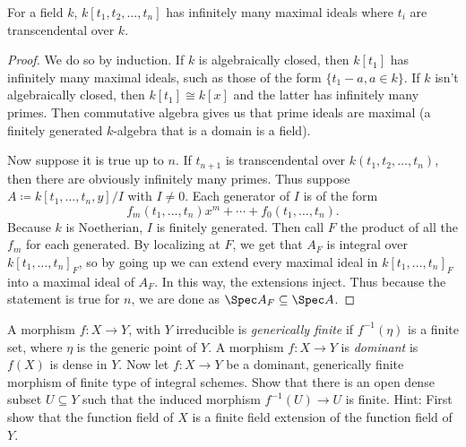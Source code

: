 \begin{lem}\label{lem:infinite_primes}
	For a field $k $, $k[t_{1},t_{2},\ldots,t_n] $ has infinitely many maximal ideals where $t_i $ are transcendental over $k $.
\end{lem}
\begin{proof}
	We do so by induction.
	If $k $ is algebraically closed, then $k[t_{1}] $ has infinitely many maximal ideals, such as those of the form $\{t_{1}-a,a\in k\}  $.
	If $k $ isn't algebraically closed, then $k[t_{1}]\cong k[x] $ and the latter has infinitely many primes.
	Then commutative algebra gives us that prime ideals are maximal (a finitely generated $k $-algebra that is a domain is a field).

	Now suppose it is true up to $n $.
	If $t_{n+1} $ is transcendental over $k(t_{1},t_{2},\ldots,t_n) $, then there are obviously infinitely many primes.
	Thus suppose $A \coloneqq k[t_{1},\ldots,t_{n}, y] / I$ with $I \ne 0 $.
	Each generator of $I $ is of the form
	\[
		f_m(t_{1},\ldots,t_n) x^m + \cdots + f_{0}(t_{1},\ldots,t_n)
	.\]
	Because $k $ is Noetherian, $I $ is finitely generated.
	Then call $F $ the product of all the $f_m $ for each generated.
	By localizing at $F $, we get that $A_{F}$ is integral over $k[t_{1},\ldots,t_n]_F $, so by going up we can extend every maximal ideal in $k[t_{1},\ldots,t_n]_F$ into a maximal ideal of $A_F$.
	In this way, the extensions inject.
	Thus because the statement is true for $n $, we are done as $\Spec A_F \subseteq \Spec A $.
\end{proof}
\begin{exercise}%
	A morphism $f: X\to Y $, with $Y $ irreducible is \textit{generically finite} if $f^{-1}(\eta ) $ is a finite set, where $\eta  $ is the generic point of $Y $. A morphism $f: X\to Y $ is \textit{dominant} is $f(X) $ is dense in $Y $. Now let $f: X\to Y $ be a dominant, generically finite morphism of finite type of integral schemes. Show that there is an open dense subset $U \subseteq Y $ such that the induced morphism $f^{-1}(U) \to U $ is finite.
	\ifhint
		Hint: First show that the function field of $X $ is a finite field extension of the function field of $Y $.
	\fi
\end{exercise}
